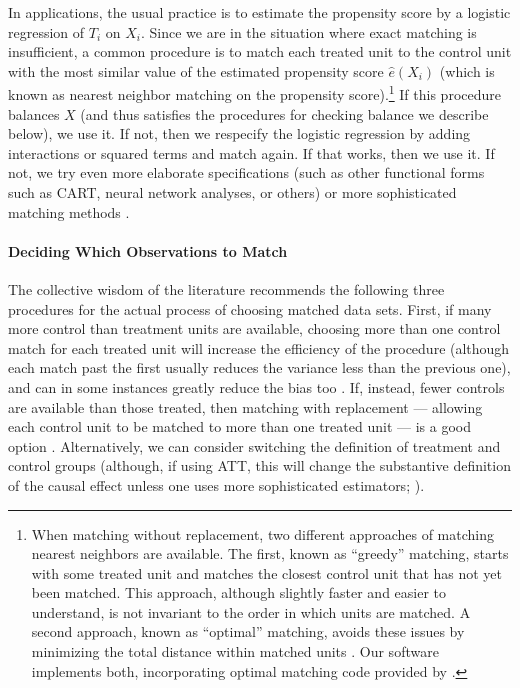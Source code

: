 \documentclass[11pt,titlepage]{article}
\begin{document}
In applications, the usual practice is to estimate the propensity
score by a logistic regression of $T_i$ on $X_i$.  Since we are in the
situation where exact matching is insufficient, a common procedure is
to match each treated unit to the control unit with the most similar
value of the estimated propensity score $\hat{e}(X_i)$ (which is known
as nearest neighbor matching on the propensity score).\footnote{When
  matching without replacement, two different approaches of matching
  nearest neighbors are available. The first, known as ``greedy''
  matching, starts with some treated unit and matches the closest
  control unit that has not yet been matched.  This approach, although
  slightly faster and easier to understand, is not invariant to the
  order in which units are matched.  A second approach, known as
  ``optimal'' matching, avoids these issues by minimizing the total
  distance within matched units \citep[e.g.,][]{Rosenbaum89}.  Our
  software implements both, incorporating optimal matching code
  provided by \citet{Hansen04}.}  If this procedure balances $X$ (and
thus satisfies the procedures for checking balance we describe below),
we use it.  If not, then we respecify the logistic regression by
adding interactions or squared terms and match again.  If that works,
then we use it.  If not, we try even more elaborate specifications
(such as other functional forms such as CART, neural network analyses,
or others) or more sophisticated matching methods
\citep{Frolich04,SmiTod05}.

\paragraph{Deciding Which Observations to Match}
The collective wisdom of the literature recommends the following three
procedures for the actual process of choosing matched data sets.
First, if many more control than treatment units are available,
choosing more than one control match for each treated unit will
increase the efficiency of the procedure (although each match past the
first usually reduces the variance less than the previous one), and
can in some instances greatly reduce the bias too \citep{Smith97}.
If, instead, fewer controls are available than those treated, then
matching with replacement --- allowing each control unit to be matched
to more than one treated unit --- is a good option \citep{DehWah99}.
Alternatively, we can consider switching the definition of treatment
and control groups (although, if using ATT, this will change the
substantive definition of the causal effect unless one uses more
sophisticated estimators; \citealt{Lechner00}).
\end{document}

